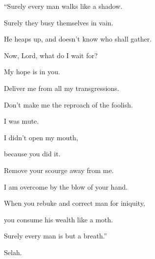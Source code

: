 {\Q {}“Surely every man walks like a shadow.
\par }{\QB Surely they busy themselves in vain.
\par }{\QB He heaps up, and doesn’t know who shall gather.
\par }{\Q {}Now, Lord, what do I wait for?
\par }{\QB My hope is in you.
\par }{\Q {}Deliver me from all my transgressions.
\par }{\QB Don’t make me the reproach of the foolish.
\par }{\Q {}I was mute.
\par }{\QB I didn’t open my mouth,
\par }{\QB because you did it.
\par }{\Q {}Remove your scourge away from me.
\par }{\QB I am overcome by the blow of your hand.
\par }{\Q {}When you rebuke and correct man for iniquity,
\par }{\QB you consume his wealth like a moth.
\par }{\Q Surely every man is but a breath.”
\par }{\QS Selah.\par }
